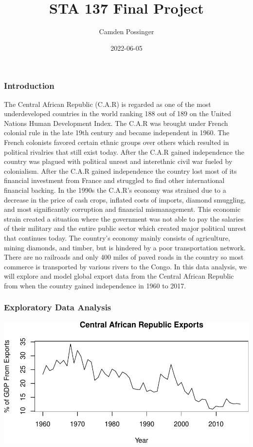 \documentclass[
]{article}
\title{STA 137 Final Project}
\author{Camden Possinger}
\date{2022-06-05}
\begin{document}
\maketitle

\hypertarget{introduction}{%
\subsubsection{Introduction}\label{introduction}}

The Central African Republic (C.A.R) is regarded as one of the most
underdeveloped countries in the world ranking 188 out of 189 on the
United Nations Human Development Index. The C.A.R was brought under
French colonial rule in the late 19th century and became independent in
1960. The French colonists favored certain ethnic groups over others
which resulted in political rivalries that still exist today. After the
C.A.R gained independence the country was plagued with political unrest
and interethnic civil war fueled by colonialism. After the C.A.R gained
independence the country lost most of its financial investment from
France and struggled to find other international financial backing. In
the 1990s the C.A.R's economy was strained due to a decrease in the
price of cash crops, inflated costs of imports, diamond smuggling, and
most significantly corruption and financial mismanagement. This economic
strain created a situation where the government was not able to pay the
salaries of their military and the entire public sector which created
major political unrest that continues today. The country's economy
mainly consists of agriculture, mining diamonds, and timber, but is
hindered by a poor transportation network. There are no railroads and
only 400 miles of paved roads in the country so most commerce is
transported by various rivers to the Congo. In this data analysis, we
will explore and model global export data from the Central African
Republic from when the country gained independence in 1960 to 2017.

\hypertarget{exploratory-data-analysis}{%
\subsubsection{Exploratory Data
Analysis}\label{exploratory-data-analysis}}

\includegraphics{STA_137_Final_Project_files/figure-latex/unnamed-chunk-2-1.pdf}
\end{document}
